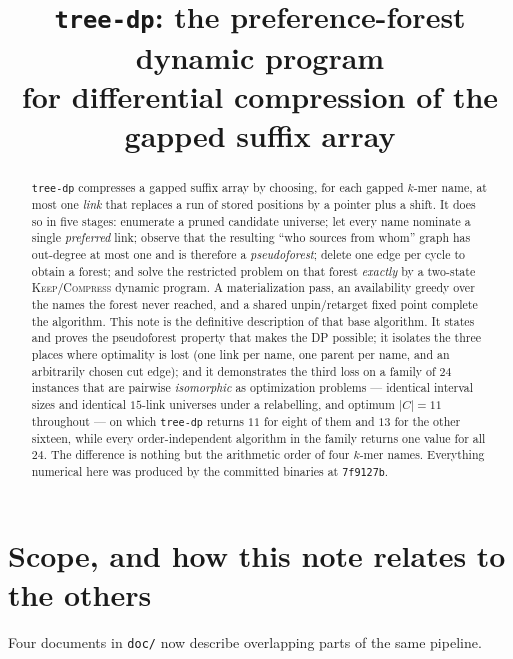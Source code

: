 \documentclass[11pt,a4paper]{article}
\title{\texttt{tree-dp}: the preference-forest dynamic program\\
for differential compression of the gapped suffix array}
\author{}
\date{}
\theoremstyle{definition}
\theoremstyle{plain}
\theoremstyle{remark}
\newcommand{\KEEP}{\textnormal{\textsc{Keep}}}
\newcommand{\COMP}{\textnormal{\textsc{Compress}}}
\begin{document}
\maketitle

\begin{abstract}
\noindent
\texttt{tree-dp} compresses a gapped suffix array by choosing, for each
gapped $k$-mer name, at most one \emph{link} that replaces a run of
stored positions by a pointer plus a shift. It does so in five stages:
enumerate a pruned candidate universe; let every name nominate a single
\emph{preferred} link; observe that the resulting ``who sources from
whom'' graph has out-degree at most one and is therefore a
\emph{pseudoforest}; delete one edge per cycle to obtain a forest; and
solve the restricted problem on that forest \emph{exactly} by a
two-state \KEEP/\COMP{} dynamic program. A materialization pass, an
availability greedy over the names the forest never reached, and a
shared unpin/retarget fixed point complete the algorithm. This note is
the definitive description of that base algorithm. It states and proves
the pseudoforest property that makes the DP possible; it isolates the
three places where optimality is lost (one link per name, one parent per
name, and an arbitrarily chosen cut edge); and it demonstrates the third
loss on a family of $24$ instances that are pairwise \emph{isomorphic}
as optimization problems --- identical interval sizes and identical
$15$-link universes under a relabelling, and optimum $|C| = 11$
throughout --- on which \texttt{tree-dp} returns $11$ for eight of them
and $13$ for the other sixteen, while every order-independent algorithm
in the family returns one value for all $24$. The difference is nothing
but the arithmetic order of four $k$-mer names. Everything numerical
here was produced by the committed binaries at \texttt{7f9127b}.
\end{abstract}

\tableofcontents

\section{Scope, and how this note relates to the others}
\label{sec:scope}

Four documents in \texttt{doc/} now describe overlapping parts of the
same pipeline.
\end{document}
